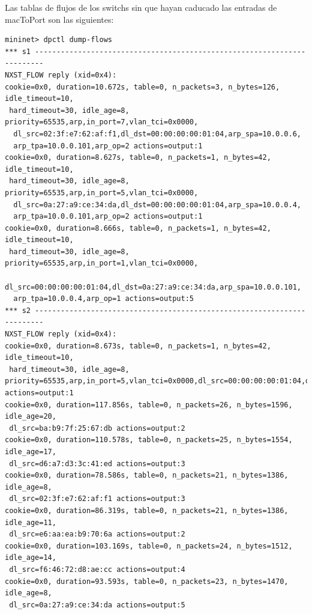 \documentclass{article}
\begin{document}
Las tablas de flujos de los switchs sin que hayan caducado las entradas de macToPort son las siguientes:

\begin{Verbatim}
mininet> dpctl dump-flows
*** s1 ------------------------------------------------------------------------
NXST_FLOW reply (xid=0x4):
cookie=0x0, duration=10.672s, table=0, n_packets=3, n_bytes=126, idle_timeout=10,
 hard_timeout=30, idle_age=8, priority=65535,arp,in_port=7,vlan_tci=0x0000,
  dl_src=02:3f:e7:62:af:f1,dl_dst=00:00:00:00:01:04,arp_spa=10.0.0.6,
  arp_tpa=10.0.0.101,arp_op=2 actions=output:1
cookie=0x0, duration=8.627s, table=0, n_packets=1, n_bytes=42, idle_timeout=10,
 hard_timeout=30, idle_age=8, priority=65535,arp,in_port=5,vlan_tci=0x0000,
  dl_src=0a:27:a9:ce:34:da,dl_dst=00:00:00:00:01:04,arp_spa=10.0.0.4,
  arp_tpa=10.0.0.101,arp_op=2 actions=output:1
cookie=0x0, duration=8.666s, table=0, n_packets=1, n_bytes=42, idle_timeout=10,
 hard_timeout=30, idle_age=8, priority=65535,arp,in_port=1,vlan_tci=0x0000,
  dl_src=00:00:00:00:01:04,dl_dst=0a:27:a9:ce:34:da,arp_spa=10.0.0.101,
  arp_tpa=10.0.0.4,arp_op=1 actions=output:5
*** s2 ------------------------------------------------------------------------
NXST_FLOW reply (xid=0x4):
cookie=0x0, duration=8.673s, table=0, n_packets=1, n_bytes=42, idle_timeout=10,
 hard_timeout=30, idle_age=8, priority=65535,arp,in_port=5,vlan_tci=0x0000,dl_src=00:00:00:00:01:04,dl_dst=0a:27:a9:ce:34:da,arp_spa=10.0.0.101,arp_tpa=10.0.0.4,arp_op=1 actions=output:1
cookie=0x0, duration=117.856s, table=0, n_packets=26, n_bytes=1596, idle_age=20,
 dl_src=ba:b9:7f:25:67:db actions=output:2
cookie=0x0, duration=110.578s, table=0, n_packets=25, n_bytes=1554, idle_age=17,
 dl_src=d6:a7:d3:3c:41:ed actions=output:3
cookie=0x0, duration=78.586s, table=0, n_packets=21, n_bytes=1386, idle_age=8,
 dl_src=02:3f:e7:62:af:f1 actions=output:3
cookie=0x0, duration=86.319s, table=0, n_packets=21, n_bytes=1386, idle_age=11,
 dl_src=e6:aa:ea:b9:70:6a actions=output:2
cookie=0x0, duration=103.169s, table=0, n_packets=24, n_bytes=1512, idle_age=14,
 dl_src=f6:46:72:d8:ae:cc actions=output:4
cookie=0x0, duration=93.593s, table=0, n_packets=23, n_bytes=1470, idle_age=8,
 dl_src=0a:27:a9:ce:34:da actions=output:5
\end{Verbatim}

\appendix
\end{document}
